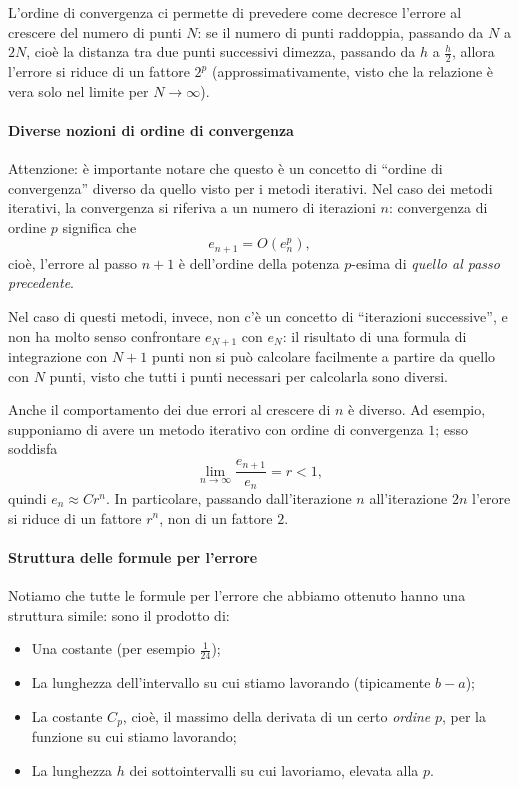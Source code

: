 \documentclass[a4paper]{report}
\theoremstyle{definiton}
\theoremstyle{remark}
\begin{document}
L'ordine di convergenza ci permette di prevedere come decresce l'errore al crescere del numero di punti $N$: se il numero di punti raddoppia, passando da $N$ a $2N$, cioè la distanza tra due punti successivi dimezza, passando da $h$ a $\frac{h}{2}$, allora l'errore si riduce di un fattore $2^p$ (approssimativamente, visto che la relazione è vera solo nel limite per $N\to\infty$).

\paragraph{Diverse nozioni di ordine di convergenza}
Attenzione: è importante notare che questo è un concetto di ``ordine di convergenza'' diverso da quello visto per i metodi iterativi. Nel caso dei metodi iterativi, la convergenza si riferiva a un numero di iterazioni $n$: convergenza di ordine $p$ significa che
\[
e_{n+1} = O(e_n^p),
\]
cioè, l'errore al passo $n+1$ è dell'ordine della potenza $p$-esima di \emph{quello al passo precedente}.

Nel caso di questi metodi, invece, non c'è un concetto di ``iterazioni successive'', e non ha molto senso confrontare $e_{N+1}$ con $e_N$: il risultato di una formula di integrazione con $N+1$ punti non si può calcolare facilmente a partire da quello con $N$ punti, visto che tutti i punti necessari per calcolarla sono diversi.

Anche il comportamento dei due errori al crescere di $n$ è diverso. Ad esempio, supponiamo di avere un metodo iterativo con ordine di convergenza $1$; esso soddisfa
\[
\lim_{n\to\infty} \frac{e_{n+1}}{e_n} = r < 1,
\]
quindi $e_n \approx C r^n$. In particolare, passando dall'iterazione $n$ all'iterazione $2n$ l'erore si riduce di un fattore $r^n$, non di un fattore $2$.

\paragraph{Struttura delle formule per l'errore} Notiamo che tutte le formule per l'errore che abbiamo ottenuto hanno una struttura simile: sono il prodotto di:
\begin{itemize}
    \item Una costante (per esempio $\frac{1}{24}$);
    \item La lunghezza dell'intervallo su cui stiamo lavorando (tipicamente $b-a$);
    \item La costante $C_p$, cioè, il massimo della derivata di un certo \emph{ordine} $p$, per la funzione su cui stiamo lavorando;
    \item La lunghezza $h$ dei sottointervalli su cui lavoriamo, elevata alla $p$.
\end{itemize}
\end{document}
